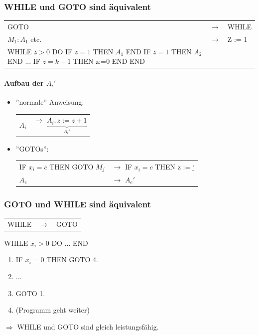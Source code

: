 \subsubsection{WHILE und GOTO sind äquivalent}

\begin{tabu}{l l X}
GOTO &$\longrightarrow$ & WHILE \\
$M_1 : A_1$ etc. & $\longrightarrow$ &
	Z := 1 \\
	WHILE $z>0$ DO
		IF $z=1$ THEN $A_1$ END
		IF $z=1$ THEN $A_2$ END
		...
		IF $z= k+1$ THEN z:=0 END
	END
\end{tabu}

\paragraph{Aufbau der $A_i'$}

\begin{itemize}
	\item ''normale'' Anweisung: \begin{tabu}{ l l }
		 			$A_i$ &$\longrightarrow$ $\underbrace{A_i; z := z+1}_{A_i'}$
	 		\end{tabu}

	\item ''GOTOs'': \begin{tabu}{ l l }
		IF $x_i = c$ THEN GOTO $M_j$ &$\longrightarrow$ IF $x_i = c$ THEN z := j \\
		$A_e$ &$\longrightarrow$ $A_e'$
	\end{tabu}
\end{itemize}

\subsubsection{GOTO und WHILE sind äquivalent}

\begin{tabu}{l l X}
	WHILE & $\longrightarrow$ & GOTO
\end{tabu}

WHILE $x_i > 0$ DO 
	...
END

\begin{enumerate}
	\item IF $x_i = 0$ THEN GOTO 4.
	\item ...
	\item GOTO 1.
	\item (Programm geht weiter)
\end{enumerate}

$\Rightarrow$ WHILE und GOTO sind gleich leistungsfähig.


